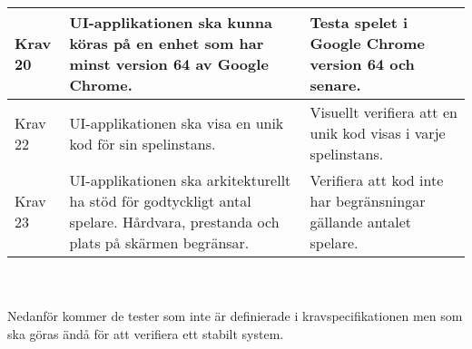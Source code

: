 \begin{tabular}{| p{1.5cm} | p{6cm} | p{8cm}|}
		\hline
		Krav 20& UI-applikationen ska kunna köras på en enhet som har minst version 64 av Google Chrome. &Testa spelet i Google Chrome version 64 och senare. \\
		\hline
		Krav 22& UI-applikationen ska visa en unik kod för sin spelinstans. &Visuellt verifiera att en unik kod visas i varje spelinstans.\\
		\hline
		Krav 23& UI-applikationen ska arkitekturellt ha stöd för godtyckligt antal spelare. Hårdvara, prestanda och plats på skärmen begränsar. &Verifiera att kod inte har begränsningar gällande antalet spelare. \\
		\hline


   
  \end{tabular}
	\\ \\
	Nedanför kommer de tester som inte är definierade i kravspecifikationen \cite{bib-kravspec} men som ska göras ändå för att verifiera ett stabilt system.
	
